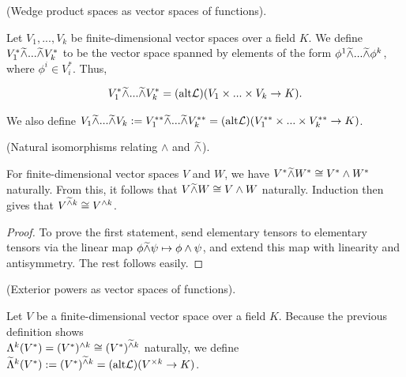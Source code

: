 \begin{defn}
    (Wedge product spaces as vector spaces of functions).
    
    Let $V_1, ..., V_k$ be finite-dimensional vector spaces over a field $K$. We define $V_1^* \widetilde{\wedge} ... \widetilde{\wedge} V_k^*$ to be the vector space spanned by elements of the form $\phi^1 \widetilde{\wedge} ... \widetilde{\wedge} \phi^k$, where $\phi^i \in V_i^*$. Thus,
    
    \begin{align*}
        V_1^* \widetilde{\wedge} ... \widetilde{\wedge} V_k^* = (\text{alt} \mathcal{L})(V_1 \times ... \times V_k \rightarrow K).
    \end{align*}
    
    We also define $V_1 \widetilde{\wedge} ... \widetilde{\wedge} V_k := V_1^{**} \widetilde{\wedge} ... \widetilde{\wedge} V_k^{**} = (\text{alt} \mathcal{L})(V_1^{**} \times ... \times V_k^{**} \rightarrow K)$.
\end{defn}

\begin{theorem}
    (Natural isomorphisms relating $\wedge$ and $\widetilde{\wedge}$).
     
    For finite-dimensional vector spaces $V$ and $W$, we have $V^* \widetilde{\wedge} W^* \cong V^* \wedge W^*$ naturally. From this, it follows that $V \widetilde{\wedge} W \cong V \wedge W$ naturally. Induction then gives that $V^{\widetilde{\wedge} k} \cong V^{\wedge k}$.
\end{theorem}

\begin{proof}
    To prove the first statement, send elementary tensors to elementary tensors via the linear map $\phi \widetilde{\wedge} \psi \mapsto \phi \wedge \psi$, and extend this map with linearity and antisymmetry. The rest follows easily.
\end{proof}

\begin{defn}
    (Exterior powers as vector spaces of functions).
    
    Let $V$ be a finite-dimensional vector space over a field $K$. Because the previous definition shows \\ ${\Lambda^k(V^*) = (V^*)^{\wedge k} \cong (V^*)^{\widetilde{\wedge} k}}$ naturally, we define $\widetilde{\Lambda}^k(V^*) := (V^*)^{\widetilde{\wedge} k} = (\text{alt} \mathcal{L})(V^{\times k} \rightarrow K)$.
\end{defn}

    
    
